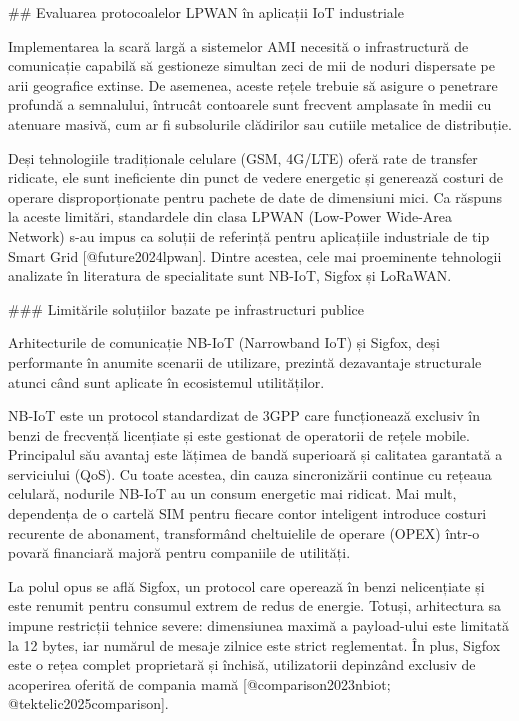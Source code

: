 ## Evaluarea protocoalelor LPWAN în aplicații IoT industriale

Implementarea la scară largă a sistemelor AMI necesită o infrastructură
de comunicație capabilă să gestioneze simultan zeci de mii de noduri
dispersate pe arii geografice extinse. De asemenea, aceste rețele
trebuie să asigure o penetrare profundă a semnalului, întrucât
contoarele sunt frecvent amplasate în medii cu atenuare masivă, cum ar
fi subsolurile clădirilor sau cutiile metalice de distribuție.

Deși tehnologiile tradiționale celulare (GSM, 4G/LTE) oferă rate de
transfer ridicate, ele sunt ineficiente din punct de vedere energetic și
generează costuri de operare disproporționate pentru pachete de date de
dimensiuni mici. Ca răspuns la aceste limitări, standardele din clasa
LPWAN (Low-Power Wide-Area Network) s-au impus ca soluții de referință
pentru aplicațiile industriale de tip Smart Grid [@future2024lpwan].
Dintre acestea, cele mai proeminente tehnologii analizate în literatura
de specialitate sunt NB-IoT, Sigfox și LoRaWAN.

### Limitările soluțiilor bazate pe infrastructuri publice

Arhitecturile de comunicație NB-IoT (Narrowband IoT) și Sigfox, deși
performante în anumite scenarii de utilizare, prezintă dezavantaje
structurale atunci când sunt aplicate în ecosistemul utilităților.

NB-IoT este un protocol standardizat de 3GPP care funcționează exclusiv
în benzi de frecvență licențiate și este gestionat de operatorii de
rețele mobile. Principalul său avantaj este lățimea de bandă superioară
și calitatea garantată a serviciului (QoS). Cu toate acestea, din cauza
sincronizării continue cu rețeaua celulară, nodurile NB-IoT au un consum
energetic mai ridicat. Mai mult, dependența de o cartelă SIM pentru
fiecare contor inteligent introduce costuri recurente de abonament,
transformând cheltuielile de operare (OPEX) într-o povară financiară
majoră pentru companiile de utilități.

La polul opus se află Sigfox, un protocol care operează în benzi
nelicențiate și este renumit pentru consumul extrem de redus de energie.
Totuși, arhitectura sa impune restricții tehnice severe: dimensiunea
maximă a payload-ului este limitată la 12 bytes, iar numărul de mesaje
zilnice este strict reglementat. În plus, Sigfox este o rețea complet
proprietară și închisă, utilizatorii depinzând exclusiv de acoperirea
oferită de compania mamă
[@comparison2023nbiot; @tektelic2025comparison].

